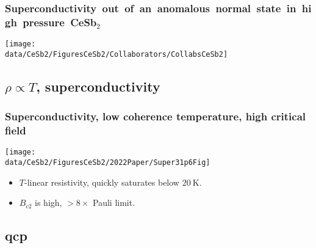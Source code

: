 


\begin{frame}[plain,label=CeSb2Grouplist]
\frametitle {\mbox{Superconductivity out of an anomalous normal state in high pressure CeSb$_2$}}
\texttt{[image: \\data/CeSb2/FiguresCeSb2/Collaborators/CollabsCeSb2]}

\end{frame}

\subsection{$\rho \propto T$, superconductivity}

\begin{frame}[label=KeyResult]
\frametitle{Superconductivity, low coherence temperature, high critical field }

\centerline{\texttt{[image: \\data/CeSb2/FiguresCeSb2/2022Paper/Super31p6Fig]}}
\begin{itemize}
\item $T$-linear resistivity, quickly saturates below $\SI{20}{\kelvin}$.
\item $B_{c2}$ is high, $>8\times$ Pauli limit.

\end{itemize}


\end{frame}

\subsection{qcp}

